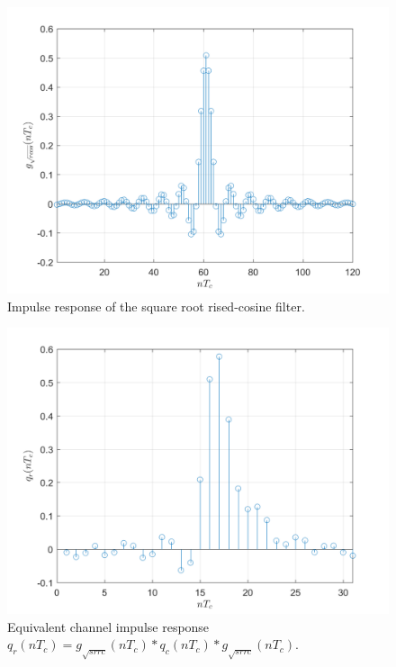 \documentclass[a4paper, 12pt]{report}
\begin{document}
\begin{figure}[H]
	\centering
	\includegraphics[width=14cm]{gsrrc_1}
	\caption{Impulse response of the square root rised-cosine filter.}
\end{figure}

\begin{figure}[H]
	\centering
	\includegraphics[width=14cm]{qr}
	\caption{Equivalent channel impulse response $q_r(nT_c) = g_{\sqrt{srrc}}(nT_c)*q_c(nT_c)*g_{\sqrt{srrc}}(nT_c)$.}\label{}
\end{figure}
\end{document}
